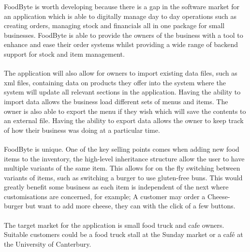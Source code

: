 FoodByte is worth developing because there is a gap in the software market for an application which is able to digitally manage day to day operations such as creating orders, managing stock and financials all in one package for small businesses. FoodByte is able to provide the owners of the business with a tool to enhance and ease their order systems whilst providing a wide range of backend support for stock and item management.
\\ \\
The application will also allow for owners to import existing data files, such as xml files, containing data on products they offer into the system where the system will update all relevant sections in the application. Having the ability to import data allows the business load different sets of menus and items. The owner is also able to export the menu if they wish which will save the contents to an external file. Having the ability to export data allows the owner to keep track of how their business was doing at a particular time.
\\ \\
FoodByte is unique. One of the key selling points comes when adding new food items to the inventory, the high-level inheritance structure allow the user to have multiple variants of the same item. This allows for on the fly switching between variants of items, such as switching a burger to use gluten-free buns. This would greatly benefit some business as each item is independent of the next where customisations are concerned, for example; A customer may order a Cheese-burger but want to add more cheese, they can with the click of a few buttons.
\\ \\
The target market for the application is small food truck and cafe owners. Suitable customers could be a food truck stall at the Sunday market or a café at the University of Canterbury.